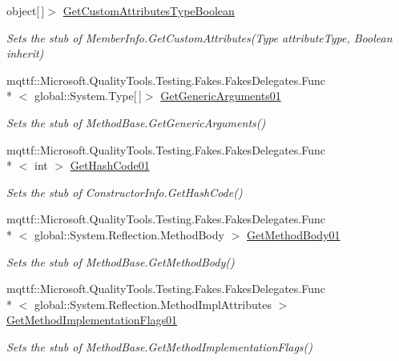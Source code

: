 \begin{DoxyCompactItemize}
object\mbox{[}$\,$\mbox{]}$>$ \hyperlink{class_system_1_1_reflection_1_1_fakes_1_1_stub_constructor_info_a14c2def5fac01929b096c0958f9ea3fb}{Get\-Custom\-Attributes\-Type\-Boolean}
\begin{DoxyCompactList}\small\item\em Sets the stub of Member\-Info.\-Get\-Custom\-Attributes(\-Type attribute\-Type, Boolean inherit)\end{DoxyCompactList}\item 
mqttf\-::\-Microsoft.\-Quality\-Tools.\-Testing.\-Fakes.\-Fakes\-Delegates.\-Func\\*
$<$ global\-::\-System.\-Type\mbox{[}$\,$\mbox{]}$>$ \hyperlink{class_system_1_1_reflection_1_1_fakes_1_1_stub_constructor_info_ad3ecbe65df41861843f8c5188be5f3a6}{Get\-Generic\-Arguments01}
\begin{DoxyCompactList}\small\item\em Sets the stub of Method\-Base.\-Get\-Generic\-Arguments()\end{DoxyCompactList}\item 
mqttf\-::\-Microsoft.\-Quality\-Tools.\-Testing.\-Fakes.\-Fakes\-Delegates.\-Func\\*
$<$ int $>$ \hyperlink{class_system_1_1_reflection_1_1_fakes_1_1_stub_constructor_info_a60353a3ba2a8f58c61a1a50e7725cce9}{Get\-Hash\-Code01}
\begin{DoxyCompactList}\small\item\em Sets the stub of Constructor\-Info.\-Get\-Hash\-Code()\end{DoxyCompactList}\item 
mqttf\-::\-Microsoft.\-Quality\-Tools.\-Testing.\-Fakes.\-Fakes\-Delegates.\-Func\\*
$<$ global\-::\-System.\-Reflection.\-Method\-Body $>$ \hyperlink{class_system_1_1_reflection_1_1_fakes_1_1_stub_constructor_info_ac0fe0f13a29190f4c1121f03c10bc650}{Get\-Method\-Body01}
\begin{DoxyCompactList}\small\item\em Sets the stub of Method\-Base.\-Get\-Method\-Body()\end{DoxyCompactList}\item 
mqttf\-::\-Microsoft.\-Quality\-Tools.\-Testing.\-Fakes.\-Fakes\-Delegates.\-Func\\*
$<$ global\-::\-System.\-Reflection.\-Method\-Impl\-Attributes $>$ \hyperlink{class_system_1_1_reflection_1_1_fakes_1_1_stub_constructor_info_af6e86bba7e387618e7cea23186ebd1d5}{Get\-Method\-Implementation\-Flags01}
\begin{DoxyCompactList}\small\item\em Sets the stub of Method\-Base.\-Get\-Method\-Implementation\-Flags()\end{DoxyCompactList}\item 

\end{DoxyCompactItemize}
